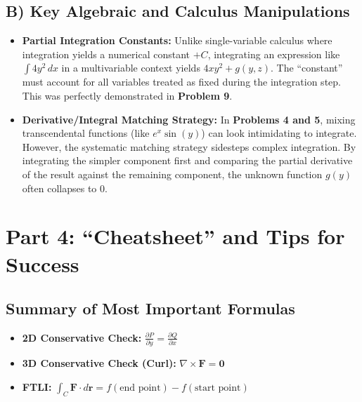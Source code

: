 \documentclass[12pt]{article}
\begin{document}
\subsection{B) Key Algebraic and Calculus Manipulations}
\begin{itemize}
    \item \textbf{Partial Integration Constants:} 
    Unlike single-variable calculus where integration yields a numerical constant $+ C$, integrating an expression like $\int 4y^2 \, dx$ in a multivariable context yields $4xy^2 + g(y, z)$. The ``constant'' must account for all variables treated as fixed during the integration step. This was perfectly demonstrated in \textbf{Problem 9}.
    \item \textbf{Derivative/Integral Matching Strategy:}
    In \textbf{Problems 4 and 5}, mixing transcendental functions (like $e^x\sin(y)$) can look intimidating to integrate. However, the systematic matching strategy sidesteps complex integration. By integrating the simpler component first and comparing the partial derivative of the result against the remaining component, the unknown function $g(y)$ often collapses to $0$.
\end{itemize}

\newpage
\section{Part 4: ``Cheatsheet'' and Tips for Success}

\subsection{Summary of Most Important Formulas}
\begin{itemize}
    \item \textbf{2D Conservative Check:} $\frac{\partial P}{\partial y} = \frac{\partial Q}{\partial x}$
    \item \textbf{3D Conservative Check (Curl):} $\nabla \times \mathbf{F} = \mathbf{0}$
    \item \textbf{FTLI:} $\int_C \mathbf{F} \cdot d\mathbf{r} = f(\text{end point}) - f(\text{start point})$
\end{itemize}
\end{document}
